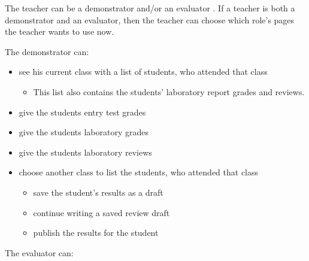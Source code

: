 The teacher can be a demonstrator and/or an evaluator . If a teacher is both a demonstrator and an evaluator, then the teacher can choose which role's pages the teacher wants to use now.


The demonstrator can:

\begin{itemize}
	\item see his current class with a list of students, who attended that class
	\begin{itemize}
		\item This list also contains the students' laboratory report grades and reviews.
	\end{itemize}
	\item give the students entry test grades
	\item give the students laboratory grades
	\item give the students laboratory reviews
	\item choose another class to list the students, who attended that class
	\begin{itemize}
		\item save the student's results as a draft
		\item continue writing a saved review draft
		\item publish the results for the student
	\end{itemize}
\end{itemize}


The evaluator can:

